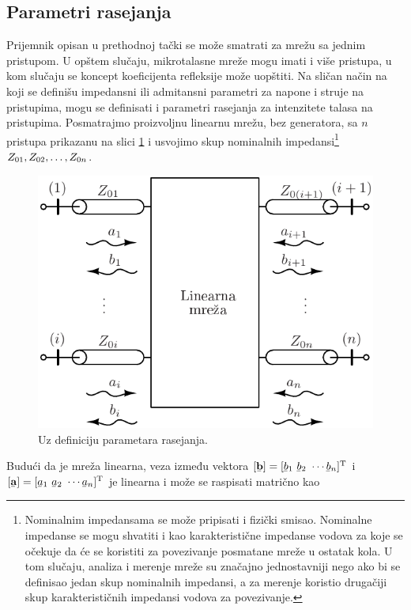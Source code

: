 \documentclass[a4paper, 12pt, diplomski]{etf}
\newcommand{\faz}[1]{\underaccent{\bar}{#1}}
\begin{document}
\subsection{Parametri rasejanja}
Prijemnik opisan u prethodnoj tački se može 
smatrati za mrežu sa jednim pristupom. U opštem 
slučaju, mikrotalasne mreže mogu imati i više pristupa,
u kom slučaju se koncept koeficijenta refleksije 
može uopštiti. Na sličan način na koji se definišu
impedansni ili admitansni 
parametri za napone i struje na pristupima,
mogu se definisati i parametri rasejanja za 
intenzitete talasa na pristupima. Posmatrajmo 
proizvoljnu linearnu 
mrežu, bez generatora, sa $n$ pristupa prikazanu na slici 
\ref{fig:nport} i usvojimo skup nominalnih 
impedansi\footnote{
Nominalnim impedansama se može pripisati i 
fizički smisao. 
Nominalne impedanse se mogu shvatiti i kao karakteristične impedanse vodova za koje se očekuje da će se koristiti za povezivanje posmatane mreže u ostatak kola. U tom slučaju, analiza i merenje mreže su značajno jednostavniji nego ako bi se definisao jedan skup nominalnih impedansi, a za merenje koristio drugačiji skup karakterističnih impedansi vodova za povezivanje.
} $Z_{\rm 01}, Z_{\rm 02}, \ldots, Z_{0n}$.
%
\begin{figure}[b!]
    \centering
    \includegraphics{fig/nport.pdf}
    \caption{Uz definiciju parametara rasejanja.
    }
    \label{fig:nport}
\end{figure}
%
Budući da je mreža linearna, veza između vektora $[\faz {\bf b}] 
= [\faz b_1\ \faz b_2\ \cdots \faz b_n]^{\rm T}$
i $[\faz {\bf a}] = [
\faz a_1\ \faz a_2\ \cdots \faz a_n]^{\rm T}$ je linearna i može se raspisati matrično kao
\end{document}
